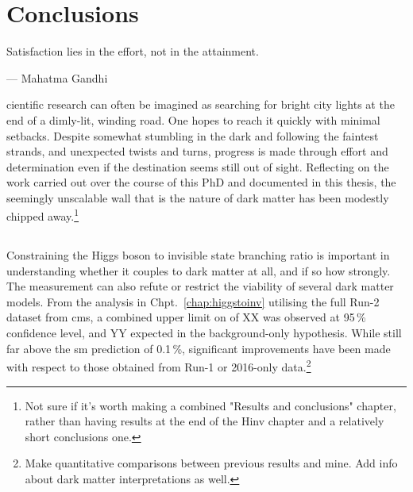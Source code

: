 \chapter{Conclusions}
\label{chap:conclusions}

\epigraph{Satisfaction lies in the effort, not in the attainment.}{--- Mahatma Gandhi}

cientific research can often be imagined as searching for bright city lights at the end of a dimly-lit, winding road. One hopes to reach it quickly with minimal setbacks. Despite somewhat stumbling in the dark and following the faintest strands, and unexpected twists and turns, progress is made through effort and determination even if the destination seems still out of sight. Reflecting on the work carried out over the course of this PhD and documented in this thesis, the seemingly unscalable wall that is the nature of dark matter has been modestly chipped away.\footnote{Not sure if it's worth making a combined "Results and conclusions" chapter, rather than having results at the end of the Hinv chapter and a relatively short conclusions one.}




\section{\texorpdfstring{\higgstoinv}{Higgs to invisible}}
\label{sec:conclusions_htoinv}

Constraining the Higgs boson to invisible state branching ratio is important in understanding whether it couples to dark matter at all, and if so how strongly. The measurement can also refute or restrict the viability of several dark matter models. From the analysis in Chpt.~\ref{chap:higgstoinv} utilising the full Run-2 dataset from \acrshort{cms}, a combined upper limit on \BRHinvFull of XX was observed at 95\,\% confidence level, and YY expected in the background-only hypothesis. While still far above the \acrlong{sm} prediction of 0.1\,\%, significant improvements have been made with respect to those obtained from Run-1 or 2016-only data.\footnote{Make quantitative comparisons between previous results and mine. Add info about dark matter interpretations as well.}

